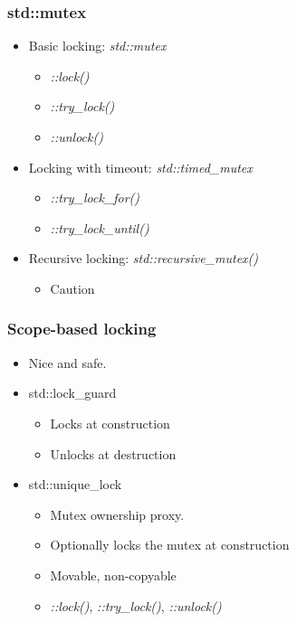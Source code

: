 \begin{frame}
  \frametitle{std::mutex}

  \begin{itemize}
  \item Basic locking: \emph{std::mutex}
    \begin{itemize}
    \item \emph{::lock()}
    \item \emph{::try\_lock()}
    \item \emph{::unlock()}
    \end{itemize}
  \item Locking with timeout: \emph{std::timed\_mutex}
    \begin{itemize}
    \item \emph{::try\_lock\_for()}
    \item \emph{::try\_lock\_until()}
    \end{itemize}
  \item Recursive locking: \emph{std::recursive\_mutex()}
    \begin{itemize}
    \item Caution
    \end{itemize}
  \end{itemize}
\end{frame}



\begin{frame}
  \frametitle{Scope-based locking}

  \begin{itemize}
  \item Nice and safe.
  \item std::lock\_guard
    \begin{itemize}
    \item Locks at construction
    \item Unlocks at destruction
    \end{itemize}
  \item std::unique\_lock
    \begin{itemize}
    \item Mutex ownership proxy.
    \item Optionally locks the mutex at construction
    \item Movable, non-copyable
    \item \emph{::lock()}, \emph{::try\_lock()}, \emph{::unlock()}
    \end{itemize}
  \end{itemize}
\end{frame}


